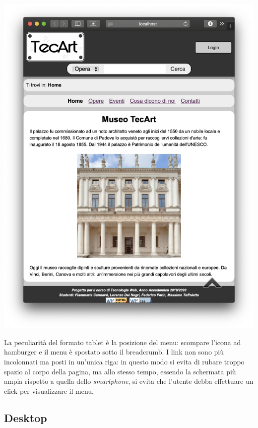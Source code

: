 \begin{center}
	\includegraphics[scale=0.45]{img/Tablet-pres}
\end{center}

La peculiarità del formato tablet è la posizione del menu: scompare l'icona ad hamburger e il menu è spostato sotto il breadcrumb. I link non sono più incolonnati ma posti in un'unica riga: in questo modo si evita di rubare troppo spazio  al corpo della pagina, ma allo stesso tempo, essendo la schermata più ampia rispetto a quella dello \textit{smartphone}, si evita che l'utente debba effettuare un click per visualizzare il menu.


\subsection{Desktop}
\label{presentazione-desktop}

